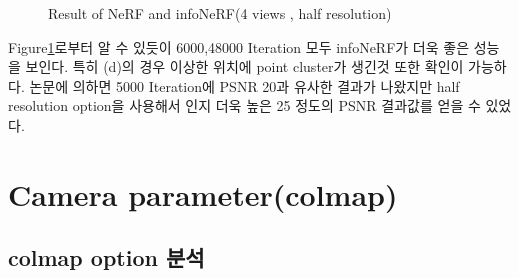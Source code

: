 \documentclass{vipweekly}
\begin{document}
\begin{figure}[h]
    \hfill
    \hfill
    \hfill

    \caption{Result of NeRF and infoNeRF(4 views , half resolution)}
    \label{fig:nerf_infoNeRF_compare}
\end{figure}

Figure\ref{fig:nerf_infoNeRF_compare}로부터 알 수 있듯이 6000,48000 Iteration 모두 infoNeRF가 더욱 좋은 성능을 보인다.
특히 (d)의 경우 이상한 위치에 point cluster가 생긴것 또한 확인이 가능하다.
논문에 의하면 5000 Iteration에 PSNR 20과 유사한 결과가 나왔지만 half resolution option을 
사용해서 인지 더욱 높은 25 정도의 PSNR 결과값를 얻을 수 있었다.



\section{Camera parameter(colmap)}

\subsection{colmap option 분석} 
\end{document}
